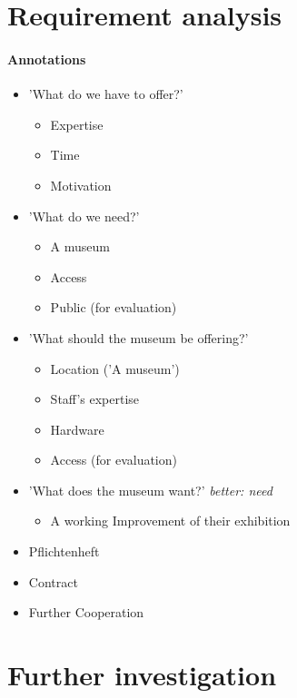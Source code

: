
\section{Requirement analysis}
\label{partnering_requirement}

\paragraph{Annotations}

\begin{itemize}
	\item 'What do we have to offer?'
	\begin{itemize}
		\item Expertise
		\item Time
		\item Motivation
	\end{itemize}
	\item 'What do we need?'
	\begin{itemize}
		\item A museum
		\item Access
		\item Public (for evaluation)
	\end{itemize}
	\item 'What should the museum be offering?'
	\begin{itemize}
		\item Location ('A museum')
		\item Staff's expertise
		\item Hardware
		\item Access (for evaluation)
	\end{itemize}
	\item 'What does the museum want?' \textit{better: need}
	\begin{itemize}
		\item A working Improvement of their exhibition
	\end{itemize}
	\item Pflichtenheft
	\item Contract
	\item Further Cooperation
\end{itemize}


\section{Further investigation}
\label{partnering_investigation}

